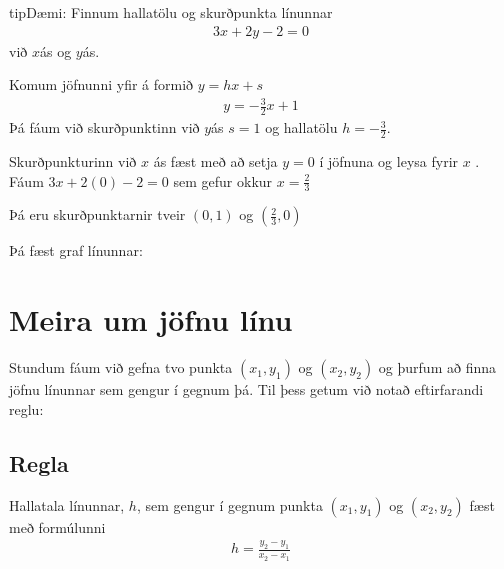\documentclass[a4paper,10pt,icelandic]{sphinxmanual}
\begin{document}
\begin{sphinxadmonition}{tip}{Dæmi:}
Finnum hallatölu og skurðpunkta línunnar
\begin{equation*}
\begin{split}3x + 2y -2 = 0\end{split}
\end{equation*}
við \(x\)\sphinxhyphen{}ás og \(y\)\sphinxhyphen{}ás.

Komum jöfnunni yfir á formið \(y=hx+s\)
\begin{equation*}
\begin{split}y = -\frac{3}{2} x + 1\end{split}
\end{equation*}
Þá fáum við skurðpunktinn við \(y\)\sphinxhyphen{}ás \(s = 1\) og hallatölu \(h= -\frac{3}{2}\).

Skurðpunkturinn við \(x\) \sphinxhyphen{}ás fæst með að setja \(y=0\) í jöfnuna og leysa fyrir \(x\) . Fáum \(3x + 2(0) -2 = 0\) sem gefur okkur \(x = \frac{2}{3}\)

Þá eru skurðpunktarnir tveir \((0, 1)\) og \((\frac{2}{3}, 0)\)

Þá fæst graf línunnar:

\end{sphinxadmonition}


\section{Meira um jöfnu línu}
\label{\detokenize{Kafli03:meira-um-jofnu-linu}}
Stundum fáum við gefna tvo punkta \((x_1,y_1)\) og \((x_2,y_2)\) og þurfum að finna jöfnu línunnar sem gengur í gegnum þá. Til þess getum við notað eftirfarandi reglu:


\subsection{Regla}
\label{\detokenize{Kafli03:id1}}
Hallatala línunnar, \(h\), sem gengur í gegnum punkta \((x_1,y_1)\) og \((x_2,y_2)\) fæst með formúlunni
\begin{equation*}
\begin{split}h=\frac{y_2-y_1}{x_2-x_1}\end{split}
\end{equation*}
\end{document}
